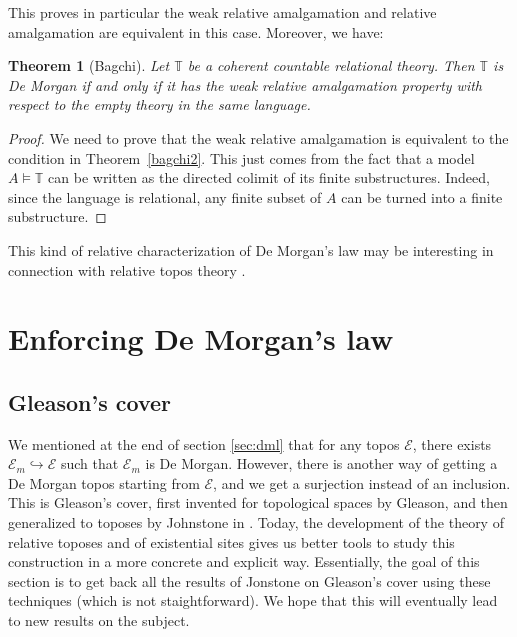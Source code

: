 \documentclass{article}
\newtheorem{theorem}{Theorem}
\newcommand{\T}{\mathbb{T}}
\begin{document}
This proves in particular the weak relative amalgamation and relative amalgamation are equivalent in this case. Moreover, we have:
\begin{theorem}[Bagchi]
    Let $\T$ be a coherent countable relational theory. Then $\T$ is De Morgan if and only if it has the weak relative amalgamation property with respect to the empty theory in the same language.
\end{theorem}
\begin{proof}
    We need to prove that the weak relative amalgamation is equivalent to the condition in Theorem~\ref{bagchi2}. This just comes from the fact that a model $A\models\T$ can be written as the directed colimit of its finite substructures. Indeed, since the language is relational, any finite subset of $A$ can be turned into a finite substructure. 
\end{proof}

This kind of relative characterization of De Morgan's law may be interesting in connection with relative topos theory \cite{caramello2021relative}.

\section{Enforcing De Morgan's law}\label{sec:enforce}
\subsection{Gleason's cover}
We mentioned at the end of section \ref{sec:dml} that for any topos $\mathcal{E}$, there exists $\mathcal{E}_m\hookrightarrow{}\mathcal{E}$ such that $\mathcal{E}_m$ is De Morgan. However, there is another way of getting a De Morgan topos starting from $\mathcal{E}$, and we get a surjection instead of an inclusion. This is Gleason's cover, first invented for topological spaces by Gleason, and then generalized to toposes by Johnstone in \cite{johnstone1980gleason}. Today, the development of the theory of relative toposes \cite{caramello2021relative} and of existential sites \cite{caramello2022fibred} gives us better tools to study this construction in a more concrete and explicit way. Essentially, the goal of this section is to get back all the results of Jonstone on Gleason's cover using these techniques (which is not staightforward). We hope that this will eventually lead to new results on the subject.
\end{document}
